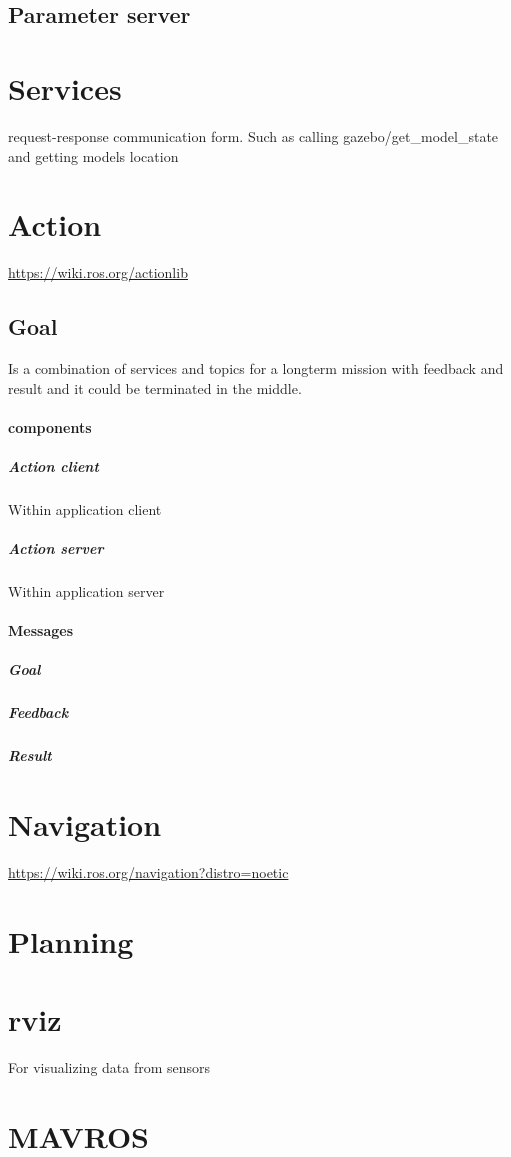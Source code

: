     \subsection{Parameter server}
\section{Services}
    request-response communication form. Such as calling gazebo/get\_model\_state and getting models location
\section{Action}
    \url{https://wiki.ros.org/actionlib}
    
    \subsection{Goal}

Is a combination of services and topics for a longterm mission with feedback and result and it could be terminated in the middle.
    \paragraph{components}
        \subparagraph{Action client}
            Within application client
        \subparagraph{Action server}
            Within application server
    
    \paragraph{Messages}
        \subparagraph{Goal}
        \subparagraph{Feedback}
        \subparagraph{Result}

\section{Navigation}
    \url{https://wiki.ros.org/navigation?distro=noetic}

\section{Planning}
\section{rviz}
    For visualizing data from sensors
\section{MAVROS}
